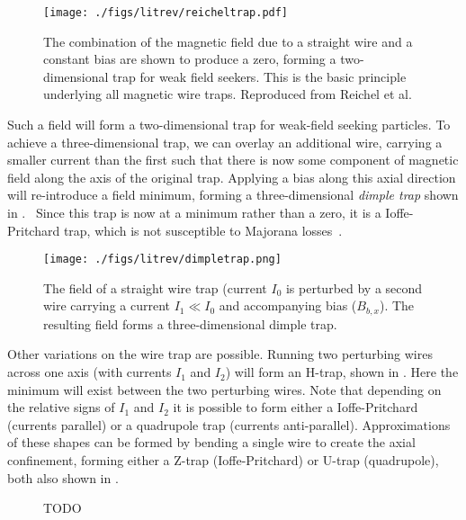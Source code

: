 \begin{figure}
  \texttt{[image: ./figs/litrev/reicheltrap.pdf]}
  \caption{The combination of the magnetic field due to a straight wire and a
  constant bias are shown to produce a zero, forming a two-dimensional trap for
  weak field seekers. This is the basic principle underlying all magnetic wire
  traps. Reproduced from Reichel et al.~\cite{Reichel1999}
  }
  \label{litrev:fig:reicheltrap}
\end{figure}

Such a field will form a two-dimensional trap for weak-field seeking particles.
To achieve a three-dimensional trap, we can overlay an additional wire,
carrying a smaller current than the first such that there is now some component
of magnetic field along the axis of the original trap. Applying a bias along
this axial direction will re-introduce a field minimum, forming a three-dimensional
\emph{dimple trap} shown in .~\cite{2011Ac}
Since this trap is now at a minimum rather than a zero, it is a Ioffe-Pritchard
trap, which is not susceptible to Majorana losses~\cite{PhysRevLett.51.1336}.

\begin{figure}
  \texttt{[image: ./figs/litrev/dimpletrap.png]}
  \caption{The field of a straight wire trap (current $I_0$ is perturbed by a
  second wire carrying a current $I_1 \ll I_0 $ and accompanying bias
  ($B_{b,x}$). The resulting field forms a three-dimensional dimple trap.
  }
  \label{litrev:fig:dimpletrap}
\end{figure}

Other variations on the wire trap are possible. Running two perturbing wires
across one axis (with currents $I_1$ and $I_2$) will form an H-trap, shown in
. Here the minimum will exist between the
two perturbing wires. Note that depending on the relative signs of $I_1$ and
$I_2$ it is possible to form either a Ioffe-Pritchard (currents parallel) or a
quadrupole trap (currents anti-parallel). Approximations of these shapes can be
formed by bending a single wire to create the axial confinement, forming either
a Z-trap (Ioffe-Pritchard) or U-trap (quadrupole), both also shown in
.

\begin{figure}
  \caption{TODO
  }
  \label{litrev:fig:trapvariations}
\end{figure}

